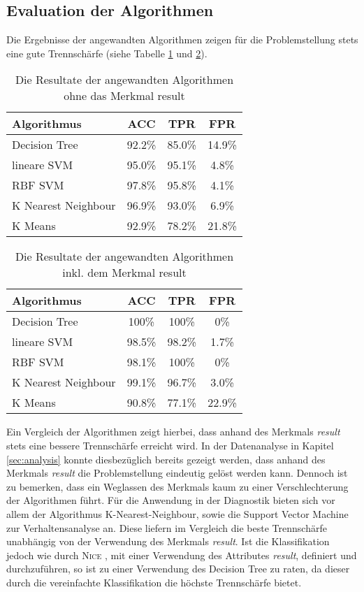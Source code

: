 \subsection{Evaluation der Algorithmen} \label{sec:evaluation}
Die Ergebnisse der angewandten Algorithmen zeigen für die Problemstellung stets eine gute Trennschärfe (siehe Tabelle \ref{tbl:results_table_without} und \ref{tbl:results_table}).

\begin{table}[htbp]
\caption{Die Resultate der angewandten Algorithmen ohne das Merkmal \glqq result\grqq}
\label{tbl:results_table_without}
\begin{tabular}{l c c c}
\textbf{Algorithmus} & \textbf{ACC} & \textbf{TPR} & \textbf{FPR} \\ \hline
Decision Tree & 92.2\% & 85.0\% & 14.9\% \\
lineare SVM & 95.0\% & 95.1\% & 4.8\% \\
RBF SVM & 97.8\% & 95.8\% & 4.1\% \\
K Nearest Neighbour & 96.9\% & 93.0\% & 6.9\%\\ 
K Means & 92.9\% & 78.2\% & 21.8\%\\ 
\end{tabular}
\centering
\end{table}

\begin{table}[htbp]
\caption{Die Resultate der angewandten Algorithmen inkl. dem Merkmal \glqq result\grqq}
\label{tbl:results_table}
\begin{tabular}{l c c c}
\textbf{Algorithmus} & \textbf{ACC} & \textbf{TPR} & \textbf{FPR} \\ \hline
Decision Tree & 100\% & 100\% & 0\% \\
lineare SVM & 98.5\% & 98.2\% & 1.7\% \\
RBF SVM & 98.1\% & 100\% & 0\% \\
K Nearest Neighbour & 99.1\% & 96.7\% & 3.0\%\\ 
K Means & 90.8\% & 77.1\% & 22.9\%\\ 
\end{tabular}
\centering
\end{table}

Ein Vergleich der Algorithmen zeigt hierbei, dass anhand des Merkmals \textit{result} stets eine bessere Trennschärfe erreicht wird. In der Datenanalyse in Kapitel \ref{sec:analysis} konnte diesbezüglich bereits gezeigt werden, dass anhand des Merkmals \textit{result} die Problemstellung eindeutig gelöst werden kann. Dennoch ist zu bemerken, dass ein Weglassen des Merkmals kaum zu einer Verschlechterung der Algorithmen führt. Für die Anwendung in der Diagnostik bieten sich vor allem der Algorithmus K-Nearest-Neighbour, sowie die Support Vector Machine zur Verhaltensanalyse an. Diese liefern im Vergleich die beste Trennschärfe unabhängig von der Verwendung des Merkmals \textit{result}. Ist die Klassifikation jedoch wie durch \textsc{Nice} \cite{NICE2012}, mit einer Verwendung des Attributes \textit{result}, definiert und durchzuführen, so ist zu einer Verwendung des Decision Tree zu raten, da dieser durch die vereinfachte Klassifikation die höchste Trennschärfe bietet.